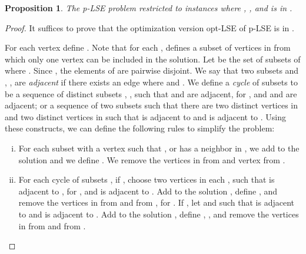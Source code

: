 \documentclass[11pt]{article}
\newtheorem{proposition}[theorem]{Proposition}
\begin{document}
\begin{proposition}\label{prop:pLSE-in-P}
The p-LSE problem restricted to instances where , , and  is in .
\end{proposition}
\begin{proof}
It suffices to prove that the optimization version opt-LSE of p-LSE is in .

For each vertex  define . Note that for each ,  defines a subset of vertices in  from which only one vertex can be included in the solution.  Let  be the set of subsets of  where . Since , the elements of  are pairwise disjoint. We say that two subsets  and , , are {\em adjacent} if there exists an edge  where  and .  We define a {\em cycle} of subsets to be a sequence of distinct subsets , , such that  and  are adjacent, for , and  and  are adjacent; or a sequence of two subsets  such that there are two distinct vertices  in  and two distinct vertices  in  such that  is adjacent to  and  is adjacent to .  Using these constructs, we can define the following rules to simplify the problem:

\begin{enumerate}[(i)]
  \item For each subset  with a vertex  such that , or  has a neighbor in , we add  to the solution  and we define . We remove the vertices in  from  and vertex  from .

  \item For each cycle of subsets , if , choose two vertices  in each ,  such that  is adjacent to , for , and  is adjacent to . Add  to the solution , define , and remove the vertices in  from  and  from , for . If , let  and  such that  is adjacent to  and  is adjacent to . Add  to the solution , define , , and remove the vertices in  from  and  from .
\end{enumerate}


\end{proof}
\end{document}
